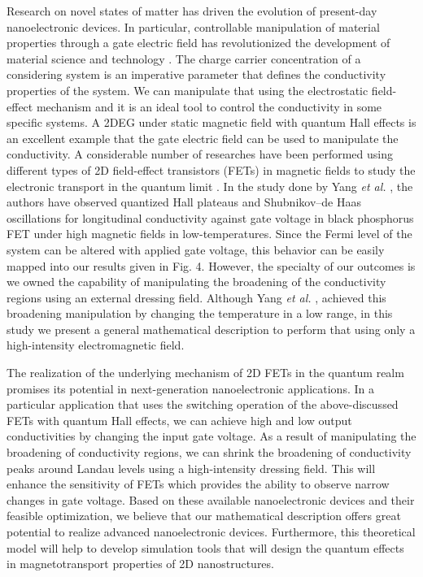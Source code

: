 \documentclass{article}
\begin{document}
\begin{itemize}
{  Research on novel states of matter has driven the evolution of present-day nanoelectronic devices. In particular, controllable manipulation of material properties through a gate electric field has revolutionized the development of material science and technology \cite{ahn03,deng18}.
  The charge carrier concentration of a considering system is an imperative parameter that defines the conductivity properties of the system. We can manipulate that using the electrostatic field-effect mechanism and it is an ideal tool to control the conductivity in some specific systems.
  A 2DEG under static magnetic field with quantum Hall effects is an excellent example that the gate electric field can be used to manipulate the conductivity. A considerable number of researches have been performed using different types of 2D field-effect transistors (FETs) in magnetic fields to study the electronic transport in the quantum limit \cite{wakabayashi78,yang18,long20,li14}. In the study done by Yang \textit{et al.} \cite{yang18}, the authors have observed quantized Hall plateaus and Shubnikov–de Haas oscillations for longitudinal conductivity against gate voltage in black phosphorus FET under high magnetic fields in low-temperatures. Since the Fermi level of the system can be altered with applied gate voltage, this behavior can be easily mapped into our results given in Fig. 4. However, the specialty of our outcomes is we owned the capability of manipulating the broadening of the conductivity regions using an external dressing field. Although Yang \textit{et al.} \cite{yang18}, achieved this broadening manipulation by changing the temperature in a low range, in this study we present a general mathematical description to perform that using only a high-intensity electromagnetic field.

  The realization of the underlying mechanism of 2D FETs in the quantum realm promises its potential in next-generation nanoelectronic applications. In a particular application that uses the switching operation of the above-discussed FETs with quantum Hall effects, we can achieve high and low output conductivities by changing the input gate voltage. As a result of manipulating the broadening of conductivity regions, we can shrink the broadening of conductivity peaks around Landau levels using a high-intensity dressing field. This will enhance the sensitivity of FETs which provides the ability to observe narrow changes in gate voltage. Based on these available nanoelectronic devices and their feasible optimization, we believe that our mathematical description offers great potential to realize advanced nanoelectronic devices. Furthermore, this theoretical model will help to develop simulation tools that will design the quantum effects in magnetotransport properties of 2D nanostructures.
  }
\end{itemize}
\end{document}
